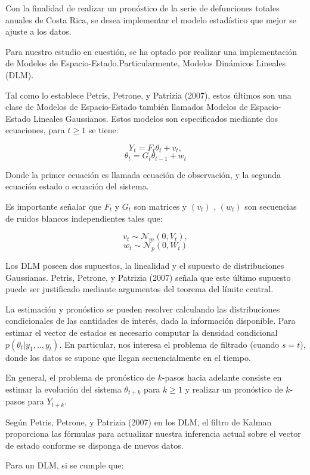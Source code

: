 \documentclass[
  letterpaper,
  onepage,
  openany]{report}
\begin{document}
Con la finalidad de realizar un pronóstico de la serie de defunciones
totales anuales de Costa Rica, se desea implementar el modelo
estadístico que mejor se ajuste a los datos.

Para nuestro estudio en cuestión, se ha optado por realizar una
implementación de Modelos de Espacio-Estado.Particularmente, Modelos
Dinámicos Lineales (DLM).

Tal como lo establece Petris, Petrone, y Patrizia (2007), estos últimos
son una clase de Modelos de Espacio-Estado también llamados Modelos de
Espacio-Estado Lineales Gaussianos. Estos modelos son especificados
mediante dos ecuaciones, para \(t \geq 1\) se tiene:

\[ Y_{t}= F_{t} \theta_{t} + v_{t} , \]
\[  \theta_{t}= G_{t} \theta_{t-1} + w_{t}   \]

Donde la primer ecuación es llamada ecuación de observación, y la
segunda ecuación estado o ecuación del sistema.

Es importante señalar que \(F_{t}\) y \(G_{t}\) son matrices y
\((v_{t})\) , \((w_{t})\) son secuencias de ruidos blancos
independientes tales que:

\[ v_{t} \sim \mathcal{N}_{m}(0,V_{t}) , \]
\[  w_{t} \sim \mathcal{N}_{p}(0,W_{t})  \]

Los DLM poseen dos supuestos, la linealidad y el supuesto de
distribuciones Gaussianas. Petris, Petrone, y Patrizia (2007) señala que
este último supuesto puede ser justificado mediante argumentos del
teorema del límite central.

La estimación y pronóstico se pueden resolver calculando las
distribuciones condicionales de las cantidades de interés, dada la
información disponible. Para estimar el vector de estados es necesario
computar la densidad condicional \(p(\theta_{t} |y_{1}, .., y_{t})\). En
particular, nos interesa el problema de filtrado (cuando \(s=t\)), donde
los datos se supone que llegan secuencialmente en el tiempo.

En general, el problema de pronóstico de \(k\)-pasos hacia adelante
consiste en estimar la evolución del sistema \(\theta_{t+k}\) para
\(k \geq 1\) y realizar un pronóstico de \(k\)-pasos para \(Y_{t+k}\).

Según Petris, Petrone, y Patrizia (2007) en los DLM, el filtro de Kalman
proporciona las fórmulas para actualizar nuestra inferencia actual sobre
el vector de estado conforme se disponga de nuevos datos.

Para un DLM, si se cumple que:
\end{document}
